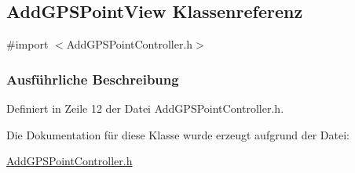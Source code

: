 \hypertarget{interface_add_g_p_s_point_view}{
\subsection{AddGPSPointView Klassenreferenz}
\label{interface_add_g_p_s_point_view}
}


{\ttfamily \#import $<$AddGPSPointController.h$>$}

\subsubsection{Ausführliche Beschreibung}


Definiert in Zeile 12 der Datei AddGPSPointController.h.

Die Dokumentation für diese Klasse wurde erzeugt aufgrund der Datei:\begin{DoxyCompactItemize}
\item 
\hyperlink{_add_g_p_s_point_controller_8h}{AddGPSPointController.h}\end{DoxyCompactItemize}
